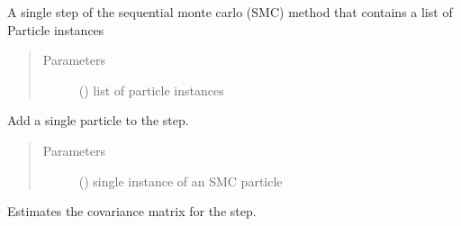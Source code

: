 \documentclass[letterpaper,10pt,english]{sphinxmanual}
\begin{document}
\begin{fulllineitems}
\label{\detokenize{source_code:smcpy.smc.smc_step.SMCStep}}
A single step of the sequential monte carlo (SMC) method that contains
a list of Particle instances
\begin{quote}\begin{description}
\item[{Parameters}] \leavevmode
{} () \textendash{} list of particle instances

\end{description}\end{quote}

\begin{fulllineitems}
\label{\detokenize{source_code:smcpy.smc.smc_step.SMCStep.add_particle}}
Add a single particle to the step.
\begin{quote}\begin{description}
\item[{Parameters}] \leavevmode
{} () \textendash{} single instance of an SMC particle

\end{description}\end{quote}

\end{fulllineitems}


\begin{fulllineitems}
\label{\detokenize{source_code:smcpy.smc.smc_step.SMCStep.calculate_covariance}}
Estimates the covariance matrix for the step.

\end{fulllineitems}



\end{fulllineitems}
\end{document}

